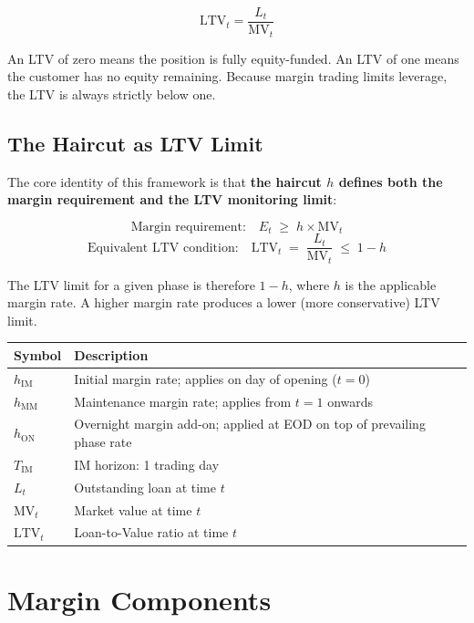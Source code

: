 \documentclass[9pt, a4paper]{extarticle}
\newenvironment{formulabox}{\par\addvspace{4pt}}{\par\addvspace{4pt}}
\begin{document}
\begin{formulabox}
\[
    \mathrm{LTV}_t = \frac{L_t}{\mathrm{MV}_t}
\]
\end{formulabox}

An LTV of zero means the position is fully equity-funded. An LTV of one means the
customer has no equity remaining. Because margin trading limits leverage, the LTV is
always strictly below one.

\subsection{The Haircut as LTV Limit}

The core identity of this framework is that \textbf{the haircut $h$ defines both the
margin requirement and the LTV monitoring limit}:

\begin{formulabox}
\[
    \text{Margin requirement:} \quad E_t \;\geq\; h \times \mathrm{MV}_t
\]
\[
    \text{Equivalent LTV condition:} \quad \mathrm{LTV}_t \;=\; \frac{L_t}{\mathrm{MV}_t}
    \;\leq\; 1 - h
\]
\end{formulabox}

The LTV limit for a given phase is therefore $1 - h$, where $h$ is the applicable
margin rate. A higher margin rate produces a lower (more conservative) LTV limit.

\begin{tabularx}{\linewidth}{lX}
\toprule
\textbf{Symbol} & \textbf{Description} \\
\midrule
$h_{\mathrm{IM}}$   & Initial margin rate; applies on day of opening ($t = 0$) \\
$h_{\mathrm{MM}}$   & Maintenance margin rate; applies from $t = 1$ onwards \\
$h_{\mathrm{ON}}$   & Overnight margin add-on; applied at EOD on top of prevailing phase rate \\
$T_{\mathrm{IM}}$   & IM horizon: 1 trading day \\
$L_t$               & Outstanding loan at time $t$ \\
$\mathrm{MV}_t$     & Market value at time $t$ \\
$\mathrm{LTV}_t$    & Loan-to-Value ratio at time $t$ \\
\bottomrule
\end{tabularx}

\section{Margin Components}
\label{sec:components}
\end{document}
